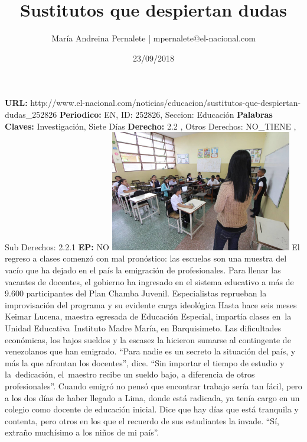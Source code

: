 \documentclass{article}%
\title{\textbf{Sustitutos que despiertan dudas}}%
\author{María Andreina Pernalete | mpernalete@el{-}nacional.com}%
\date{23/09/2018}%
\begin{document}
%
\normalsize%
\maketitle%
\textbf{URL: }%
http://www.el{-}nacional.com/noticias/educacion/sustitutos{-}que{-}despiertan{-}dudas\_252826\newline%
%
\textbf{Periodico: }%
EN, %
ID: %
252826, %
Seccion: %
Educación\newline%
%
\textbf{Palabras Claves: }%
Investigación, Siete Días\newline%
%
\textbf{Derecho: }%
2.2%
, Otros Derechos: %
NO\_TIENE%
, Sub Derechos: %
2.2.1%
\newline%
%
\textbf{EP: }%
NO\newline%
\newline%
%
\textbf{\textit{}}%
\newline%
\newline%
%
\includegraphics[width=300px]{79.jpg}%
\newline%
%
El regreso a clases comenzó con mal pronóstico: las escuelas son una muestra del vacío que ha dejado en el país la emigración de profesionales. Para llenar las vacantes de docentes, el gobierno ha ingresado en el sistema educativo a más de 9.600 participantes del Plan Chamba Juvenil. Especialistas reprueban la improvisación del programa y su evidente carga ideológica%
\newline%
%
Hasta hace seis meses Keimar Lucena, maestra egresada de Educación Especial, impartía clases en~la Unidad Educativa~Instituto Madre María, en Barquisimeto. Las dificultades económicas, los bajos sueldos y la escasez la hicieron sumarse al contingente de venezolanos que han emigrado. “Para nadie es un secreto la situación del país, y más la que afrontan los docentes”, dice. “Sin importar el tiempo de estudio y la~dedicación, el~maestro recibe un sueldo bajo, a diferencia de otros profesionales”.%
\newline%
%
Cuando emigró no pensó que encontrar trabajo sería tan fácil, pero a los dos días de haber llegado a Lima, donde está radicada, ya tenía cargo en un colegio como docente de educación inicial. Dice que hay días que está tranquila y contenta, pero otros en los que el recuerdo de sus estudiantes la invade. “Sí, extraño muchísimo a los niños de mi país”.%
\end{document}
